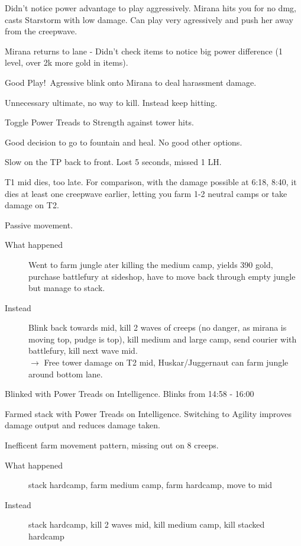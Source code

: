 \documentclass{article}
\newenvironment{eventlog}
    {
        \begin{description}
    }
    {
        \end{description}
    }
\newcommand{\logentry}[3]{\hypertarget{log:#1}{\item[\textcolor{highlight}{#1}] #2 \;#3}}
\newcommand{\goodplay}{\colorbox{goodplaycolor}{Good Play!}\ }
\begin{document}
\begin{eventlog}
    \logentry{10:40}{Didn't notice power advantage to play aggressively.}{
        Mirana hits you for no dmg, casts Starstorm with low damage. Can play very agressively and push her away from the creepwave.}

    \logentry{11:40}{Mirana returns to lane - Didn't check items to notice big power difference}{(1 level, over 2k more gold in items).}

    \logentry{12:38}{\goodplay Agressive blink onto Mirana to deal harassment damage.}{}
    \logentry{12:41}{Unnecessary ultimate, no way to kill.}{Instead keep hitting.}


    \logentry{12:46}{Toggle Power Treads to Strength against tower hits.}{}

    \logentry{13:05}{Good decision to go to fountain and heal.}{ No good other options.}


    \logentry{13:36}{Slow on the TP back to front.}{Lost 5 seconds, missed 1 LH.}

    \logentry{14:20}{T1 mid dies, too late.}{For comparison, with the damage possible at 6:18, 8:40, it dies at least one creepwave earlier, letting you farm 1-2 neutral camps or take damage on T2.}


    \logentry{14:55}{ Passive movement.}{
           \begin{description}
           \item [What happened] Went to farm jungle ater killing the medium camp, yields 390 gold, purchase battlefury at sideshop, have to move back through empty jungle but manage to stack.
            \item [Instead] Blink back towards mid, kill 2 waves of creeps (no danger, as mirana is moving top, pudge is top), kill medium and large camp, send courier with battlefury, kill next wave mid.\\ 
             $\rightarrow$ Free tower damage on T2 mid, Huskar/Juggernaut can farm jungle around bottom lane.
             \end{description}}
             

    \logentry{14:58}{Blinked with Power Treads on Intelligence.}{7 Blinks from 14:58 - 16:00}

    \logentry{16:10}{Farmed stack with Power Treads on Intelligence.}{Switching to Agility improves damage output and reduces damage taken. }

    \logentry{16:00}{Inefficent farm movement pattern, missing out on 8 creeps.}{
        \begin{description}
       \item [What happened] stack hardcamp, farm medium camp, farm hardcamp, move to mid
       \item [Instead] stack hardcamp, kill 2 waves mid, kill medium camp, kill stacked hardcamp
           \end{description}
           }


\end{eventlog}
\end{document}
